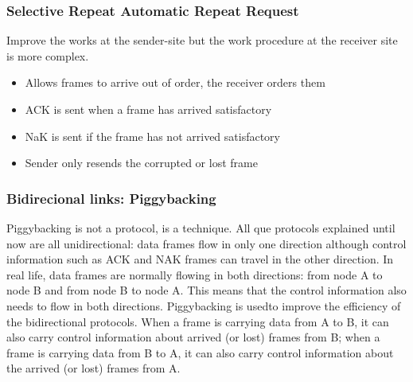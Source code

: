 \subsubsection{Selective Repeat Automatic Repeat Request}
Improve the works at the sender-site but the work procedure at the receiver site is more complex.
\begin{itemize}
\item Allows frames to arrive out of order, the receiver orders them
\item ACK is sent when a frame has arrived satisfactory
\item NaK is sent if the frame has not arrived satisfactory
\item Sender only resends the corrupted or lost frame
\end{itemize}
\subsubsection{Bidirecional links: Piggybacking}
Piggybacking is not a protocol, is a technique. All que protocols explained until now are all unidirectional: data frames flow
in only one direction although control information such as ACK and NAK frames can
travel in the other direction. In real life, data frames are normally flowing in both directions:
from node A to node B and from node B to node A. This means that the control
information also needs to flow in both directions. Piggybacking is usedto improve the efficiency of the bidirectional protocols. When a frame is carrying
data from A to B, it can also carry control information about arrived (or lost) frames
from B; when a frame is carrying data from B to A, it can also carry control information
about the arrived (or lost) frames from A.
